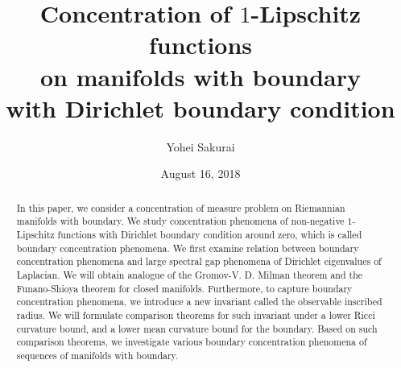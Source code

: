 \documentclass[12pt]{amsart}
\title[$1$-Lipschitz functions on manifolds with boundary]{Concentration of $1$-Lipschitz functions\\ on manifolds with boundary\\ with Dirichlet boundary condition}
\author{Yohei Sakurai}
\date{August 16, 2018}
\theoremstyle{plain}
\theoremstyle{definition}
\theoremstyle{remark}
\begin{document}
\maketitle

\begin{abstract}
In this paper,
we consider a concentration of measure problem on Riemannian manifolds with boundary.
We study concentration phenomena of non-negative $1$-Lipschitz functions with Dirichlet boundary condition around zero,
which is called boundary concentration phenomena.
We first examine relation between boundary concentration phenomena and large spectral gap phenomena of Dirichlet eigenvalues of Laplacian.
We will obtain analogue of the Gromov-V. D. Milman theorem and the Funano-Shioya theorem for closed manifolds.
Furthermore,
to capture boundary concentration phenomena,
we introduce a new invariant called the observable inscribed radius.
We will formulate comparison theorems for such invariant under a lower Ricci curvature bound,
and a lower mean curvature bound for the boundary.
Based on such comparison theorems,
we investigate various boundary concentration phenomena of sequences of manifolds with boundary.
\end{abstract}








\end{document}
